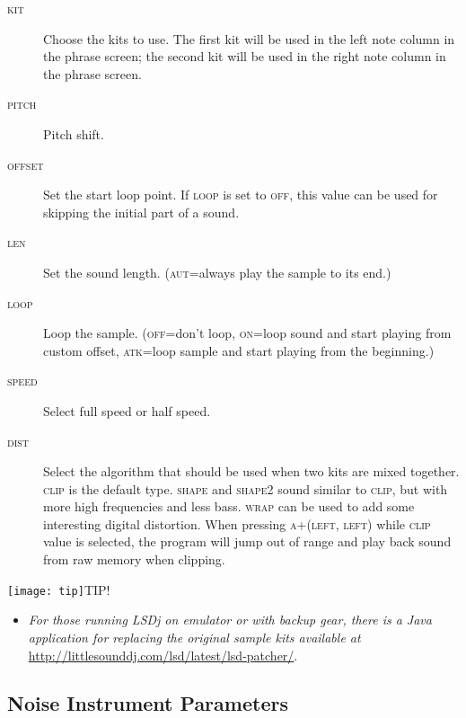 \begin{figure}[hbtp]
	\begin{center}
	\end{center}
\end{figure}

\begin{description}
	\item[\textsc{kit}] Choose the kits to use. The first kit will be used in the left note column in the phrase screen; the second kit will be used in the right note column in the phrase screen.
	\item[\textsc{pitch}] Pitch shift.
	\item[\textsc{offset}] Set the start loop point. If \textsc{loop} is set to \textsc{off}, this value can be used for skipping the initial part of a sound.
	\item[\textsc{len}] Set the sound length. (\textsc{aut}=always play the sample to its end.)
	\item[\textsc{loop}] Loop the sample. (\textsc{off}=don't loop, \textsc{on}=loop sound and start playing from custom offset, \textsc{atk}=loop sample and start playing from the beginning.)
	\item[\textsc{speed}] Select full speed or half speed.
	\item[\textsc{dist}] Select the algorithm that should be used when two kits are mixed together. \textsc{clip} is the default type. \textsc{shape} and \textsc{shape2} sound similar to \textsc{clip}, but with more high frequencies and less bass. \textsc{wrap} can be used to add some interesting digital distortion. When pressing \textsc{a+(left, left)} while \textsc{clip} value is selected, the program will jump out of range and play back sound from raw memory when clipping.
\end{description}

\texttt{[image: tip]}TIP!
\begin{itemize}
	\item \textit{For those running LSDj on emulator or with backup gear, there is a Java application for replacing the original sample kits available at} \url{http://littlesounddj.com/lsd/latest/lsd-patcher/}.
\end{itemize}

\subsection{Noise Instrument Parameters}

